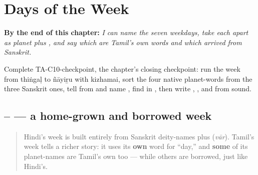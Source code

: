 
\chapter{Days of the Week}
\label{ch:ta-days-of-the-week}

\begin{chapteropening}
\textbf{By the end of this chapter:} \emph{I can name the seven weekdays, take each apart as planet plus , and say which are Tamil's own words and which arrived from Sanskrit.}

Complete TA-C10-checkpoint, the chapter's closing checkpoint: run the week from thiṅgaḷ to ñāyiṟu with kizhamai, sort the four native planet-words from the three Sanskrit ones, tell  from  and name , find  in , then write , ,  and  from sound.
\end{chapteropening}

\section[\texorpdfstring{\ta{திங்கள்}–\ta{ஞாயிறு} (thiṅgaḷ–ñāyiṟu)}{திங்கள்–ஞாயிறு (thiṅgaḷ–ñāyiṟu)}]{– — a home-grown and borrowed week}

\label{lesson:TA-C10-vaara-kizhamai}



\begin{quote}
Hindi's week is built entirely from Sanskrit deity-names plus \textbf{} (\emph{vār}). Tamil's week tells a richer story: it uses its \textbf{own} word for \textquotedblleft{}day,\textquotedblright{} and \textbf{some} of its planet-names are Tamil's own too — while others are borrowed, just like Hindi's.
\end{quote}

